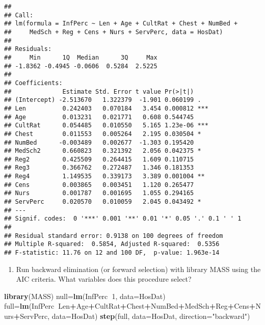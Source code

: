 \documentclass[]{article}
\newenvironment{Shaded}{\begin{snugshade}}{\end{snugshade}}
\newcommand{\KeywordTok}[1]{\textcolor[rgb]{0.13,0.29,0.53}{\textbf{#1}}}
\newcommand{\DataTypeTok}[1]{\textcolor[rgb]{0.13,0.29,0.53}{#1}}
\newcommand{\DecValTok}[1]{\textcolor[rgb]{0.00,0.00,0.81}{#1}}
\newcommand{\StringTok}[1]{\textcolor[rgb]{0.31,0.60,0.02}{#1}}
\newcommand{\OperatorTok}[1]{\textcolor[rgb]{0.81,0.36,0.00}{\textbf{#1}}}
\newcommand{\NormalTok}[1]{#1}
\providecommand{\tightlist}{%
  \setlength{\itemsep}{0pt}\setlength{\parskip}{0pt}}
\begin{document}
\begin{verbatim}
## 
## Call:
## lm(formula = InfPerc ~ Len + Age + CultRat + Chest + NumBed + 
##     MedSch + Reg + Cens + Nurs + ServPerc, data = HosDat)
## 
## Residuals:
##     Min      1Q  Median      3Q     Max 
## -1.8362 -0.4945 -0.0606  0.5284  2.5225 
## 
## Coefficients:
##              Estimate Std. Error t value Pr(>|t|)    
## (Intercept) -2.513670   1.322379  -1.901 0.060199 .  
## Len          0.242403   0.070184   3.454 0.000812 ***
## Age          0.013231   0.021771   0.608 0.544745    
## CultRat      0.054485   0.010550   5.165 1.23e-06 ***
## Chest        0.011553   0.005264   2.195 0.030504 *  
## NumBed      -0.003489   0.002677  -1.303 0.195420    
## MedSch2      0.660823   0.321392   2.056 0.042375 *  
## Reg2         0.425509   0.264415   1.609 0.110715    
## Reg3         0.366762   0.272487   1.346 0.181353    
## Reg4         1.149535   0.339173   3.389 0.001004 ** 
## Cens         0.003865   0.003451   1.120 0.265477    
## Nurs         0.001787   0.001695   1.055 0.294165    
## ServPerc     0.020570   0.010059   2.045 0.043492 *  
## ---
## Signif. codes:  0 '***' 0.001 '**' 0.01 '*' 0.05 '.' 0.1 ' ' 1
## 
## Residual standard error: 0.9138 on 100 degrees of freedom
## Multiple R-squared:  0.5854, Adjusted R-squared:  0.5356 
## F-statistic: 11.76 on 12 and 100 DF,  p-value: 1.963e-14
\end{verbatim}

\begin{enumerate}
\def\labelenumi{\Alph{enumi})}
\setcounter{enumi}{1}
\tightlist
\item
  Run backward elimination (or forward selection) with library MASS
  using the AIC criteria. What variables does this procedure select?
\end{enumerate}

\begin{Shaded}
\begin{Highlighting}[]
\KeywordTok{library}\NormalTok{(MASS)}
\NormalTok{null=}\KeywordTok{lm}\NormalTok{(InfPerc}\OperatorTok{~}\DecValTok{1}\NormalTok{, }\DataTypeTok{data=}\NormalTok{HosDat)}
\NormalTok{full=}\KeywordTok{lm}\NormalTok{(InfPerc}\OperatorTok{~}\NormalTok{Len}\OperatorTok{+}\NormalTok{Age}\OperatorTok{+}\NormalTok{CultRat}\OperatorTok{+}\NormalTok{Chest}\OperatorTok{+}\NormalTok{NumBed}\OperatorTok{+}\NormalTok{MedSch}\OperatorTok{+}\NormalTok{Reg}\OperatorTok{+}\NormalTok{Cens}\OperatorTok{+}\NormalTok{Nurs}\OperatorTok{+}\NormalTok{ServPerc, }\DataTypeTok{data=}\NormalTok{HosDat)}
\KeywordTok{step}\NormalTok{(full, }\DataTypeTok{data=}\NormalTok{HosDat, }\DataTypeTok{direction=}\StringTok{"backward"}\NormalTok{)}
\end{Highlighting}
\end{Shaded}
\end{document}
